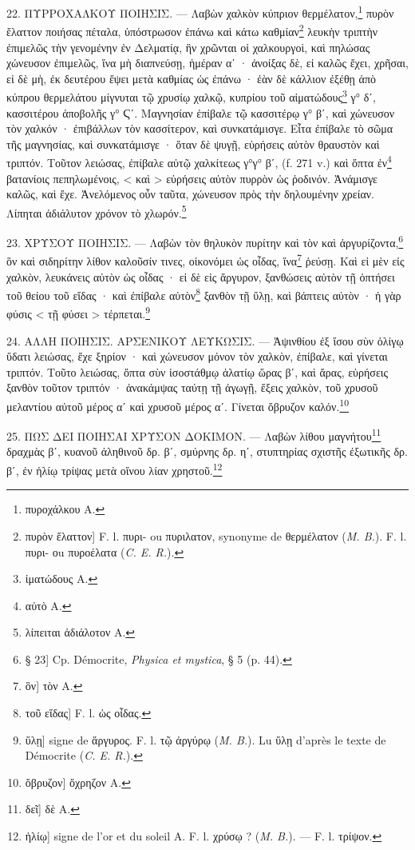 \documentclass[a4paper, 11pt, oneside, polutonikogreek, french]{article}
\begin{document}
22. ΠΥΡΡΟΧΑΛΚΟΥ ΠΟΙΗΣΙΣ. --- Λαβὼν χαλκὸν κύπριον θερμέλατον,\footnote{πυροχάλκου A.} πυρὸν ἔλαττον ποιήσας πέταλα, ὑπόστρωσον ἐπάνω καὶ κάτω καθμίαν\footnote{πυρὸν ἔλαττον] F. l. πυρι- ou πυριλατον, synonyme de θερμέλατον (\emph{M. B.}). F. l. πυρι- οu πυροέλατα (\emph{C. E. R.}).} λευκὴν τριπτὴν ἐπιμελῶς τὴν γενομένην ἐν Δελματίᾳ, ἣν χρῶνται οἱ χαλκουργοὶ, καὶ πηλώσας χώνευσον ἐπιμελῶς, ἵνα μὴ διαπνεύσῃ, ἡμέραν αʹ · ἀνοίξας δὲ, εἰ καλῶς ἔχει, χρῆσαι, εἰ δὲ μὴ, ἐκ δευτέρου ἕψει μετὰ καθμίας ὡς ἐπάνω · ἐὰν δὲ κάλλιον ἐξέθῃ ἀπὸ κύπρου θερμελάτου μίγνυται τῷ χρυσίῳ χαλκῷ, κυπρίου τοῦ αἱματώδους\footnote{ἰματώδους A.} γ° δʹ, κασσιτέρου ἀποβολῆς γ° Ϛʹ. Μαγνησίαν ἐπίβαλε τῷ κασσιτέρῳ γ° βʹ, καὶ χώνευσον τὸν χαλκόν · ἐπιβάλλων τὸν κασσίτερον, καὶ συνκατάμισγε. Εἶτα ἐπίβαλε τὸ σῶμα τῆς μαγνησίας, καὶ συνκατάμισγε · ὅταν δὲ ψυγῇ, εὑρήσεις αὐτὸν θραυστὸν καὶ τριπτόν. Τοῦτον λειώσας, ἐπίβαλε αὐτῷ χαλκίτεως γ°γ° βʹ, (f. 271 v.) καὶ ὄπτα ἐν\footnote{αὐτὸ A.} βατανίοις πεπηλωμένοις, < καὶ > εὑρήσεις αὐτὸν πυρρὸν ὡς ῥοδινόν. Ἀνάμισγε καλῶς, καὶ ἔχε. Ἀνελόμενος οὖν ταῦτα, χώνευσον πρὸς τὴν δηλουμένην χρείαν. Λίπηται ἀδιάλυτον χρόνον τὸ χλωρόν.\footnote{λίπειται ἀδιάλοτον A.}

23. ΧΡΥΣΟΥ ΠΟΙΗΣΙΣ. --- Λαβὼν τὸν θηλυκὸν πυρίτην καὶ τὸν καὶ ἀργυρίζοντα,\footnote{§ 23] Cp. Démocrite, \emph{Physica et mystica}, § 5 (p. 44).} ὃν καὶ σιδηρίτην λίθον καλοῦσίν τινες, οἰκονόμει ὡς οἶδας, ἵνα\footnote{ὃν] τὸν A.} ῥεύσῃ. Καὶ εἰ μὲν εἰς χαλκὸν, λευκάνεις αὐτὸν ὡς οἶδας · εἰ δὲ εἰς ἄργυρον, ξανθώσεις αὐτὸν τῇ ὀπτήσει τοῦ θείου τοῦ εἴδας · καὶ ἐπίβαλε αὐτὸν\footnote{τοῦ εἴδας] F. l. ὡς οἶδας.} ξανθὸν τῇ ὕλῃ, καὶ βάπτεις αὐτὸν · ἡ γὰρ φύσις < τῇ φύσει > τέρπεται.\footnote{ὕλῃ] signe de ἅργυρος. F. l. τῷ ἀργύρῳ (\emph{M. B.}). Lu ὕλῃ d'après le texte de Démocrite (\emph{C. E. R.}).}

 

24. ΑΛΛΗ ΠΟΙΗΣΙΣ. ΑΡΣΕΝΙΚΟΥ ΛΕΥΚΩΣΙΣ. --- Ἀψινθίου ἐξ ἴσου σὺν ὀλίγῳ ὕδατι λειώσας, ἔχε ξηρίον · καὶ χώνευσον μόνον τὸν χαλκὸν, ἐπίβαλε, καὶ γίνεται τριπτόν. Τοῦτο λειώσας, ὄπτα σὺν ἰσοστάθμῳ ἁλατίῳ ὥρας βʹ, καὶ ἄρας, εὑρήσεις ξανθὸν τοῦτον τριπτόν · ἀνακάμψας ταύτῃ τῇ ἀγωγῇ, ἕξεις χαλκὸν, τοῦ χρυσοῦ μελαντίου αὐτοῦ μέρος αʹ καὶ χρυσοῦ μέρος αʹ. Γίνεται ὄβρυζον καλόν.\footnote{ὄβρυζον] ὅχρηζον A.}

25. ΠΩΣ ΔΕΙ ΠΟΙΗΣΑΙ ΧΡΥΣΟΝ ΔΟΚΙΜΟΝ. --- Λαβὼν λίθου μαγνήτου\footnote{δεῖ] δὲ A.} δραχμὰς βʹ, κυανοῦ ἀληθινοῦ δρ. βʹ, σμύρνης δρ. ηʹ, στυπτηρίας σχιστῆς ἐξωτικῆς δρ. βʹ, ἐν ἡλίῳ τρίψας μετὰ οἴνου λίαν χρηστοῦ.\footnote{ἡλίῳ] signe de l'or et du soleil A. F. l. χρύσῳ ? (\emph{M. B.}). --- F. l. τρίψον.}
\end{document}
